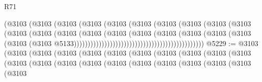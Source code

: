 \begin{lexlean}{R71}
\begin{coremodule}
                                                      (@3103
                                                        (@3103
                                                          (@3103
                                                            (@3103
                                                              (@3103
                                                                (@3103
                                                                  (@3103
                                                                    (@3103
                                                                      (@3103
                                                                        (@3103
                                                                          (@3103
                                                                            (@3103
                                                                              (@3103
                                                                                (@3103
                                                                                  (@3103
                                                                                    (@3103
                                                                                      (@3103
                                                                                        (@3103
                                                                                          (@3103
                                                                                            (@3103
                                                                                              (@3103
                                                                                                (@3103
                                                                                                  @5133)))))))))))))))))))))))))))))))))))))))))))))))
@5229 := @3103
    (@3103
      (@3103
        (@3103
          (@3103
            (@3103
              (@3103
                (@3103
                  (@3103
                    (@3103
                      (@3103
                        (@3103
                          (@3103
                            (@3103
                              (@3103
                                (@3103
                                  (@3103
                                    (@3103
                                      (@3103
                                        (@3103
                                          (@3103
                                            (@3103

\end{coremodule}
\end{lexlean}
